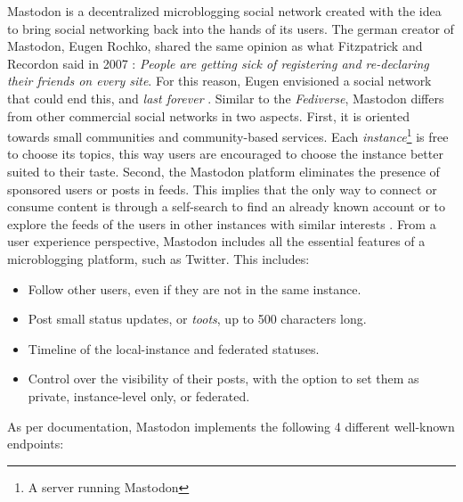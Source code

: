  Mastodon is a decentralized microblogging social network created with the idea to bring social networking back into the hands of its users. The german creator of Mastodon, Eugen Rochko, shared the same opinion as what Fitzpatrick and Recordon said in 2007 \cite{fitzpatrick_recordon_2007}: \emph{People are getting sick of registering and re-declaring their friends on every site}. For this reason, Eugen envisioned a social network that could end this, and \emph{last forever} \cite{tilley_2018}. Similar to the \emph{Fediverse}, Mastodon differs from other commercial social networks in two aspects. First, it is oriented towards small communities and community-based services. Each \emph{instance}\footnote{A server running Mastodon} is free to choose its topics, this way users are encouraged to choose the instance better suited to their taste. Second, the Mastodon platform eliminates the presence of sponsored users or posts in feeds. This implies that the only way to connect or consume content is through a self-search to find an already known account or to explore the feeds of the users in other instances with similar interests \cite{8845221}. From a user experience perspective, Mastodon includes all the essential features of a microblogging platform, such as Twitter. This includes: 

\begin{itemize}
  \item Follow other users, even if they are not in the same instance. 
  \item Post small status updates, or \emph{toots}, up to 500 characters long. 
  \item Timeline of the local-instance and federated statuses. 
  \item Control over the visibility of their posts, with the option to set them as private, instance-level only, or federated. 
\end{itemize}


\cite{nottingham_2019}
As per documentation, Mastodon implements the following 4 different well-known endpoints: 


